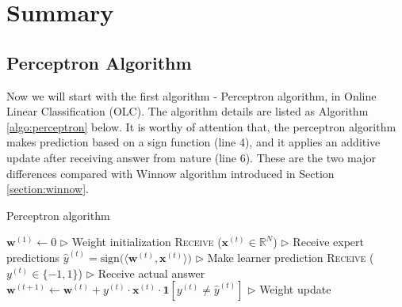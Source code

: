 \documentclass[11pt]{article}
\begin{document}

\section{Summary}

\subsection{Perceptron Algorithm}
Now we will start with the first algorithm - Perceptron algorithm, in Online Linear Classification (OLC). The algorithm details are listed as Algorithm \ref{algo:perceptron} below. It is worthy of attention that, the perceptron algorithm makes prediction based on a sign function (line 4), and it applies an additive update after receiving answer from nature (line 6). These are the two major differences compared with Winnow algorithm introduced in Section \ref{section:winnow}.
\begin{algorithm}[H]
\caption{Perceptron algorithm}
\label{algo:perceptron}
\begin{algorithmic}[1]
\STATE $\textbf{w}^{(1)} \leftarrow 0$ \hfill $\triangleright$ Weight initialization
\STATE \textsc{Receive} ($\textbf{x}^{(t)}\in \mathbb{R}^N$) \hfill $\triangleright$ Receive expert predictions
\STATE $\hat{y}^{(t)} = \text{sign}\Big(\langle \textbf{w}^{(t)}, \textbf{x}^{(t)}\rangle \Big)$ \hfill $\triangleright$ Make learner prediction
\STATE \textsc{Receive} ($y^{(t)}\in\{-1, 1\}$) \hfill $\triangleright$ Receive actual answer
\STATE $\textbf{w}^{(t+1)}\leftarrow \textbf{w}^{(t)} + y^{(t)} \cdot \textbf{x}^{(t)} \cdot\textbf{1}[y^{(t)}\neq \hat{y}^{(t)}] $ \hfill $\triangleright$ Weight update
\ENDFOR
\end{algorithmic}
\end{algorithm}
\end{document}
